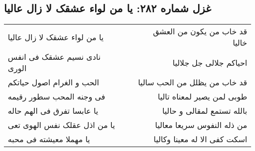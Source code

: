 \begin{center}
\section*{غزل شماره ۲۸۲: یا من لواء عشقک لا زال عالیا}
\label{sec:0282}
\begin{longtable}{l p{0.5cm} r}
یا من لواء عشقک لا زال عالیا
&&
قد خاب من یکون من العشق خالیا
\\
نادی نسیم عشقک فی انفس الوری
&&
احیاکم جلالی جل جلالیا
\\
الحب و الغرام اصول حیاتکم
&&
قد خاب من یظلل من الحب سالیا
\\
فی وجنه المحب سطور رقیمه
&&
طوبی لمن یصیر لمعناه تالیا
\\
یا عابسا تفرق فی الهم حاله
&&
بالله تستمع لمقالی و حالیا
\\
یا من اذل عقلک نفس الهوی تعی
&&
من ذله النفوس سریعا معالیا
\\
یا مهملا معیشته فی محبه
&&
اسکت کفی الا له معینا وکالیا
\\
\end{longtable}
\end{center}
